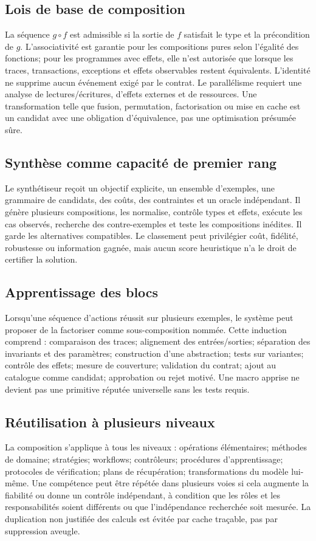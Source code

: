 \documentclass[11pt,a4paper]{article}
\begin{document}
\subsection{Lois de base de composition}
La séquence $g\circ f$ est admissible si la sortie de $f$ satisfait le type et la précondition de $g$. L'associativité est garantie pour les compositions pures selon l'égalité des fonctions; pour les programmes avec effets, elle n'est autorisée que lorsque les traces, transactions, exceptions et effets observables restent équivalents. L'identité ne supprime aucun événement exigé par le contrat. Le parallélisme requiert une analyse de lectures/écritures, d'effets externes et de ressources. Une transformation telle que fusion, permutation, factorisation ou mise en cache est un candidat avec une obligation d'équivalence, pas une optimisation présumée sûre.

\subsection{Synthèse comme capacité de premier rang}
Le synthétiseur reçoit un objectif explicite, un ensemble d'exemples, une grammaire de candidats, des coûts, des contraintes et un oracle indépendant. Il génère plusieurs compositions, les normalise, contrôle types et effets, exécute les cas observés, recherche des contre-exemples et teste les compositions inédites. Il garde les alternatives compatibles. Le classement peut privilégier coût, fidélité, robustesse ou information gagnée, mais aucun score heuristique n'a le droit de certifier la solution.

\subsection{Apprentissage des blocs}
Lorsqu'une séquence d'actions réussit sur plusieurs exemples, le système peut proposer de la factoriser comme sous-composition nommée. Cette induction comprend : comparaison des traces; alignement des entrées/sorties; séparation des invariants et des paramètres; construction d'une abstraction; tests sur variantes; contrôle des effets; mesure de couverture; validation du contrat; ajout au catalogue comme candidat; approbation ou rejet motivé. Une macro apprise ne devient pas une primitive réputée universelle sans les tests requis.

\subsection{Réutilisation à plusieurs niveaux}
La composition s'applique à tous les niveaux : opérations élémentaires; méthodes de domaine; stratégies; workflows; contrôleurs; procédures d'apprentissage; protocoles de vérification; plans de récupération; transformations du modèle lui-même. Une compétence peut être répétée dans plusieurs voies si cela augmente la fiabilité ou donne un contrôle indépendant, à condition que les rôles et les responsabilités soient différents ou que l'indépendance recherchée soit mesurée. La duplication non justifiée des calculs est évitée par cache traçable, pas par suppression aveugle.
\end{document}
